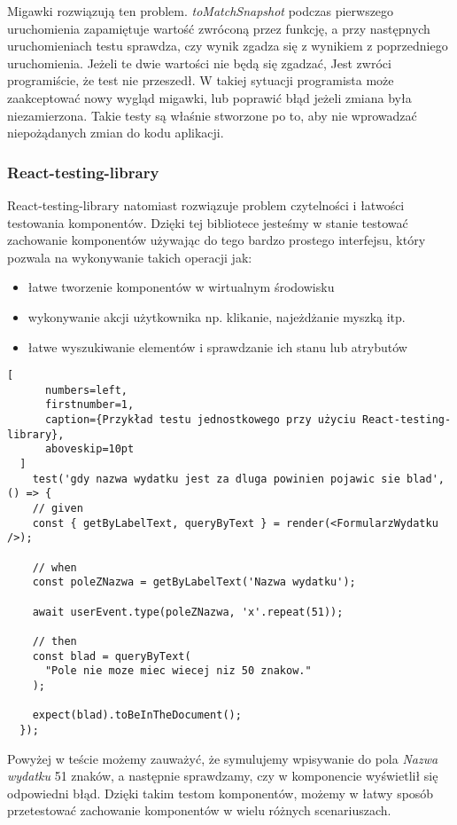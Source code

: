 \begin{description}
  Migawki rozwiązują ten problem. \emph{toMatchSnapshot} podczas pierwszego uruchomienia zapamiętuje wartość zwróconą przez funkcję, a przy następnych uruchomieniach testu sprawdza, czy wynik zgadza się z wynikiem z poprzedniego uruchomienia. Jeżeli te dwie wartości nie będą się zgadzać, Jest zwróci programiście, że test nie przeszedł. W takiej sytuacji programista może zaakceptować nowy wygląd migawki, lub poprawić błąd jeżeli zmiana była niezamierzona. Takie testy są właśnie stworzone po to, aby nie wprowadzać niepożądanych zmian do kodu aplikacji.

\subsubsection{React-testing-library} React-testing-library natomiast rozwiązuje problem czytelności i łatwości testowania komponentów. Dzięki tej bibliotece jesteśmy w stanie testować zachowanie komponentów używając do tego bardzo prostego interfejsu, który pozwala na wykonywanie takich operacji jak:
\begin{itemize}
  \item łatwe tworzenie komponentów w wirtualnym środowisku
  \item wykonywanie akcji użytkownika np. klikanie, najeżdżanie myszką itp.
  \item łatwe wyszukiwanie elementów i sprawdzanie ich stanu lub atrybutów
\end{itemize}


\end{description}
  \begin{addmargin}[6mm]{0mm}
  \begin{lstlisting}[
      numbers=left,
      firstnumber=1,
      caption={Przykład testu jednostkowego przy użyciu React-testing-library},
      aboveskip=10pt
  ]
    test('gdy nazwa wydatku jest za dluga powinien pojawic sie blad', () => {
    // given
    const { getByLabelText, queryByText } = render(<FormularzWydatku />);

    // when
    const poleZNazwa = getByLabelText('Nazwa wydatku');

    await userEvent.type(poleZNazwa, 'x'.repeat(51));

    // then
    const blad = queryByText(
      "Pole nie moze miec wiecej niz 50 znakow."
    );

    expect(blad).toBeInTheDocument();
  });
  \end{lstlisting}
  \end{addmargin}
  Powyżej w teście możemy zauważyć, że symulujemy wpisywanie do pola \emph{Nazwa wydatku} 51 znaków, a następnie sprawdzamy, czy w komponencie wyświetlił się odpowiedni błąd. Dzięki takim testom komponentów, możemy w łatwy sposób przetestować zachowanie komponentów w wielu różnych scenariuszach.

